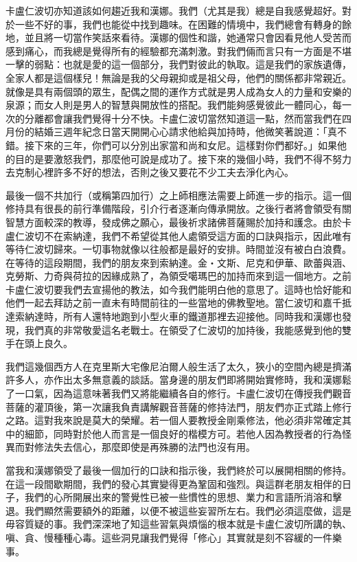 卡盧仁波切亦知道該如何趨近我和漢娜。我們（尤其是我）總是自我感覺超好。對於一些不好的事，我們也能從中找到趣味。在困難的情境中，我們總會有轉身的餘地，並且將一切當作笑話來看待。漢娜的個性和諧，她通常只會因看見他人受苦而感到痛心，而我總是覺得所有的經驗都充滿刺激。對我們倆而言只有一方面是不堪一擊的弱點：也就是愛的這一個部分，我們對彼此的執取。這是我們的家族遺傳，全家人都是這個樣兒！無論是我的父母親抑或是祖父母，他們的關係都非常親近。就像是具有兩個頭的眾生，配偶之間的運作方式就是男人成為女人的力量和安樂的泉源；而女人則是男人的智慧與開放性的搭配。我們能夠感覺彼此一體同心，每一次的分離都會讓我們覺得十分不快。卡盧仁波切當然知道這一點，然而當我們在四月份的結婚三週年紀念日當天開開心心請求他給與加持時，他微笑著說道：「真不錯。接下來的三年，你們可以分別出家當和尚和女尼。這樣對你們都好。」如果他的目的是要激怒我們，那麼他可說是成功了。接下來的幾個小時，我們不得不努力去克制心裡許多不好的想法，否則之後又要花不少工夫去淨化內心。

最後一個不共加行（或稱第四加行）之上師相應法需要上師進一步的指示。這一個修持具有很長的前行準備階段，引介行者逐漸向傳承開放。之後行者將會領受有關智慧方面較深的教導，發成佛之願心，最後祈求諸佛菩薩賜於加持和護念。由於卡盧仁波切不在索納達，我們不希望從其他人處領受這方面的口訣與指示，因此唯有等待仁波切歸來。一切事物就像以往般都是最好的安排。時間並沒有被白白浪費。在等待的這段期間，我們的朋友來到索納達。金‧文斯、尼克和伊華、歐蕾與涵、克勞斯、力奇與荷拉的因緣成熟了，為領受噶瑪巴的加持而來到這一個地方。之前卡盧仁波切要我們去宣揚他的教法，如今我們能明白他的意思了。這時也恰好能和他們一起去拜訪之前一直未有時間前往的一些當地的佛教聖地。當仁波切和嘉千抵達索納達時，所有人還特地跑到小型火車的鐵道那裡去迎接他。同時我和漢娜也發現，我們真的非常敬愛這名老戰士。在領受了仁波切的加持後，我能感覺到他的雙手在頭上良久。

我們這幾個西方人在克里斯大宅像尼泊爾人般生活了太久，狹小的空間內總是擠滿許多人，亦作出太多無意義的談話。當身邊的朋友們即將開始實修時，我和漢娜鬆了一口氣，因為這意味著我們又將能繼續各自的修行。卡盧仁波切在傳授我們觀音菩薩的灌頂後，第一次讓我負責講解觀音菩薩的修持法門，朋友們亦正式踏上修行之路。這對我來說是莫大的榮耀。若一個人要教授金剛乘修法，他必須非常確定其中的細節，同時對於他人而言是一個良好的楷模方可。若他人因為教授者的行為怪異而對修法失去信心，那麼即使是再殊勝的法門也沒有用。

當我和漢娜領受了最後一個加行的口訣和指示後，我們終於可以展開相關的修持。在這一段間歇期間，我們的發心其實變得更為鞏固和強烈。與這群老朋友相伴的日子，我們的心所開展出來的警覺性已被一些慣性的思想、業力和言語所消溶和擊退。我們顯然需要額外的距離，以便不被這些妄習所左右。我們必須這麼做，這是毋容質疑的事。我們深深地了知這些習氣與煩惱的根本就是卡盧仁波切所講的執、嗔、貪、慢種種心毒。這些洞見讓我們覺得「修心」其實就是刻不容緩的一件樂事。

